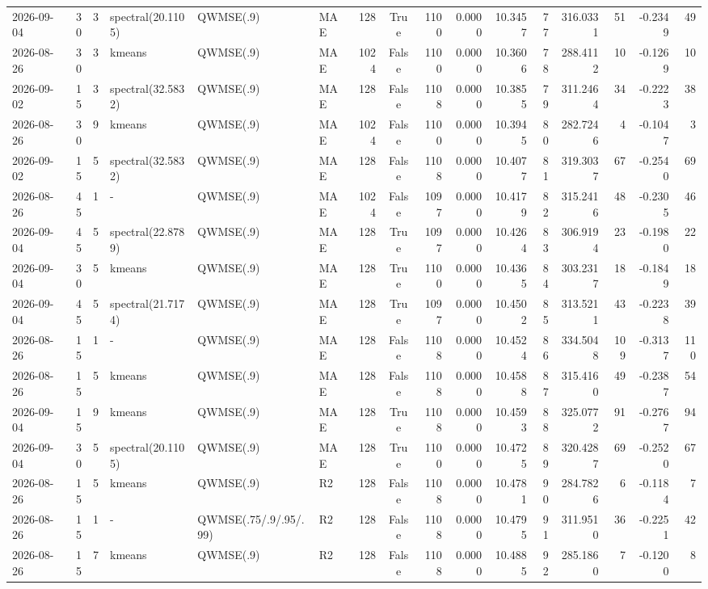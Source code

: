 \documentclass[10pt]{article}
\begin{document}
\begin{landscape}
\begin{longtable}{@{}lrrlllrcrrrrrrrr@{}}
2026-09-04 & 30 & 3 & spectral(20.1105) & QWMSE(.9) & MAE & 128 & True & 1100 & 0.0000 & 10.3457 & 77 & 316.0331 & 51 & -0.2349 & 49 \\
2026-08-26 & 30 & 3 & kmeans & QWMSE(.9) & MAE & 1024 & False & 1100 & 0.0000 & 10.3606 & 78 & 288.4112 & 10 & -0.1269 & 10 \\
2026-09-02 & 15 & 3 & spectral(32.5832) & QWMSE(.9) & MAE & 128 & False & 1108 & 0.0000 & 10.3855 & 79 & 311.2464 & 34 & -0.2223 & 38 \\
2026-08-26 & 30 & 9 & kmeans & QWMSE(.9) & MAE & 1024 & False & 1100 & 0.0000 & 10.3945 & 80 & 282.7246 & 4 & -0.1047 & 3 \\
2026-09-02 & 15 & 5 & spectral(32.5832) & QWMSE(.9) & MAE & 128 & False & 1108 & 0.0000 & 10.4077 & 81 & 319.3037 & 67 & -0.2540 & 69 \\
2026-08-26 & 45 & 1 & - & QWMSE(.9) & MAE & 1024 & False & 1097 & 0.0000 & 10.4179 & 82 & 315.2416 & 48 & -0.2305 & 46 \\
2026-09-04 & 45 & 5 & spectral(22.8789) & QWMSE(.9) & MAE & 128 & True & 1097 & 0.0000 & 10.4264 & 83 & 306.9194 & 23 & -0.1980 & 22 \\
2026-09-04 & 30 & 5 & kmeans & QWMSE(.9) & MAE & 128 & True & 1100 & 0.0000 & 10.4365 & 84 & 303.2317 & 18 & -0.1849 & 18 \\
2026-09-04 & 45 & 5 & spectral(21.7174) & QWMSE(.9) & MAE & 128 & True & 1097 & 0.0000 & 10.4502 & 85 & 313.5211 & 43 & -0.2238 & 39 \\
2026-08-26 & 15 & 1 & - & QWMSE(.9) & MAE & 128 & False & 1108 & 0.0000 & 10.4524 & 86 & 334.5048 & 109 & -0.3137 & 110 \\
2026-08-26 & 15 & 5 & kmeans & QWMSE(.9) & MAE & 128 & False & 1108 & 0.0000 & 10.4588 & 87 & 315.4160 & 49 & -0.2387 & 54 \\
2026-09-04 & 15 & 9 & kmeans & QWMSE(.9) & MAE & 128 & True & 1108 & 0.0000 & 10.4593 & 88 & 325.0772 & 91 & -0.2767 & 94 \\
2026-09-04 & 30 & 5 & spectral(20.1105) & QWMSE(.9) & MAE & 128 & True & 1100 & 0.0000 & 10.4725 & 89 & 320.4287 & 69 & -0.2520 & 67 \\
2026-08-26 & 15 & 5 & kmeans & QWMSE(.9) & R2 & 128 & False & 1108 & 0.0000 & 10.4781 & 90 & 284.7826 & 6 & -0.1184 & 7 \\
2026-08-26 & 15 & 1 & - & QWMSE(.75/.9/.95/.99) & R2 & 128 & False & 1108 & 0.0000 & 10.4795 & 91 & 311.9510 & 36 & -0.2251 & 42 \\
2026-08-26 & 15 & 7 & kmeans & QWMSE(.9) & R2 & 128 & False & 1108 & 0.0000 & 10.4885 & 92 & 285.1860 & 7 & -0.1200 & 8 \\

\end{longtable}
\end{landscape}
\end{document}
